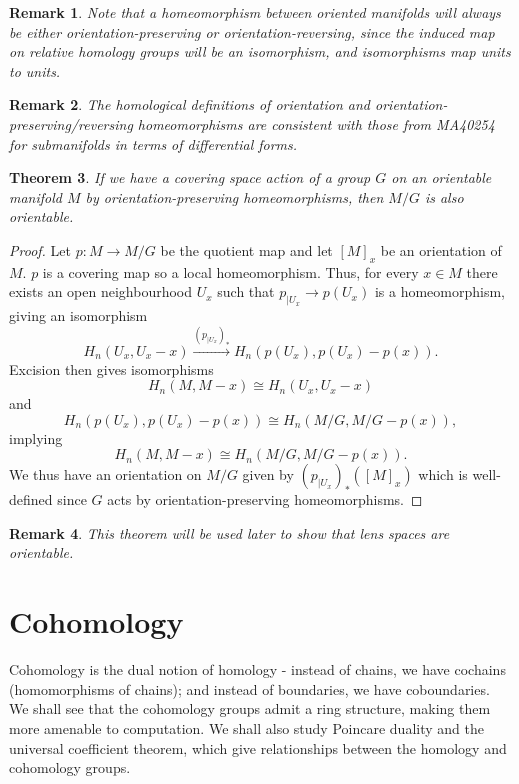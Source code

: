 \documentclass{article}
\newtheorem{theorem}{Theorem}[section]
\newtheorem{remark}[theorem]{Remark}
\begin{document}
\begin{remark}
Note that a homeomorphism between oriented manifolds will always be either orientation-preserving or orientation-reversing, since the induced map on relative homology groups will be an isomorphism, and isomorphisms map units to units.
\end{remark}

\begin{remark}
The homological definitions of orientation and orientation-preserving/reversing homeomorphisms are consistent with those from MA40254 for submanifolds in terms of differential forms.
\end{remark}

\begin{theorem}
If we have a covering space action of a group $G$ on an orientable manifold $M$ by orientation-preserving homeomorphisms, then $M/G$ is also orientable.
\end{theorem}
\begin{proof}
Let $p:M\to M/G$ be the quotient map and let $[M]_x$ be an orientation of $M$. $p$ is a covering map so a local homeomorphism. Thus, for every $x\in M$ there exists an open neighbourhood $U_x$ such that $p_{|U_x}\to p(U_x)$ is a homeomorphism, giving an isomorphism \[H_n(U_x,U_x-x)\overset{(p_{|U_x})_*}{\longrightarrow}H_n(p(U_x),p(U_x)-p(x)).\] Excision then gives isomorphisms \[H_n(M,M-x)\cong H_n(U_x,U_x-x)\] and \[H_n(p(U_x),p(U_x)-p(x))\cong H_n(M/G,M/G-p(x)),\] implying \[H_n(M,M-x)\cong H_n(M/G,M/G-p(x)).\] We thus have an orientation on $M/G$ given by $(p_{|U_x})_*([M]_x)$ which is well-defined since $G$ acts by orientation-preserving homeomorphisms.
\end{proof}

\begin{remark}
This theorem will be used later to show that lens spaces are orientable.
\end{remark}


\section{Cohomology}
Cohomology is the dual notion of homology - instead of chains, we have cochains (homomorphisms of chains); and instead of boundaries, we have coboundaries. We shall see that the cohomology groups admit a ring structure, making them more amenable to computation. We shall also study Poincare duality and the universal coefficient theorem, which give relationships between the homology and cohomology groups.
\end{document}
